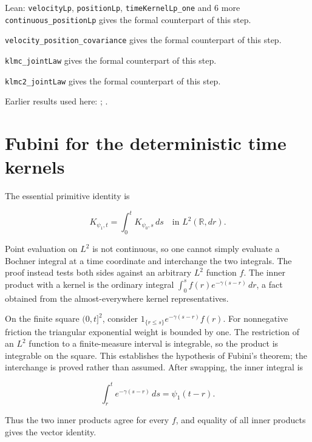 \documentclass[11pt,a4paper]{article}
\begin{document}
\begin{leanbox}{Lean: \texttt{velocityLp}, \texttt{positionLp}, \texttt{timeKernelLp\_\allowbreak{}one} and 6 more}
\texttt{continuous\_\allowbreak{}position\allowbreak{}Lp} gives the formal counterpart of this step.




\texttt{velocity\_\allowbreak{}position\_\allowbreak{}covariance} gives the formal counterpart of this step.




\texttt{klmc\_\allowbreak{}joint\allowbreak{}Law} gives the formal counterpart of this step.




\texttt{klmc2\_\allowbreak{}joint\allowbreak{}Law} gives the formal counterpart of this step.
\end{leanbox}


Earlier results used here: \cite[Section~3.8.2]{LangevinLean2026ULASC}; \cite[Section~3.8.9]{LangevinLean2026ULASC}.

\section{\texorpdfstring{Fubini for the deterministic time kernels}{Fubini for the deterministic time kernels}}


The essential primitive identity is

\[K_{\psi_1,t}=\int_0^t K_{\psi_0,s}\,ds\quad\text{in }L^2(\mathbb R,dr).\]

Point evaluation on \(L^{2}\) is not continuous, so one cannot simply evaluate a Bochner integral at a time coordinate and interchange the two integrals. The proof instead tests both sides against an arbitrary \(L^{2}\) function \(f\). The inner product with a kernel is the ordinary integral \(\int_0^s f(r)e^{-\gamma(s-r)}\,dr\), a fact obtained from the almost-everywhere kernel representatives.



On the finite square \((0,t]^2\), consider \(1_{\{r\le s\}}e^{-\gamma(s-r)}f(r)\). For nonnegative friction the triangular exponential weight is bounded by one. The restriction of an \(L^{2}\) function to a finite-measure interval is integrable, so the product is integrable on the square. This establishes the hypothesis of Fubini's theorem; the interchange is proved rather than assumed. After swapping, the inner integral is

\[\int_r^t e^{-\gamma(s-r)}\,ds=\psi_1(t-r).\]

Thus the two inner products agree for every \(f\), and equality of all inner products gives the vector identity.
\end{document}

